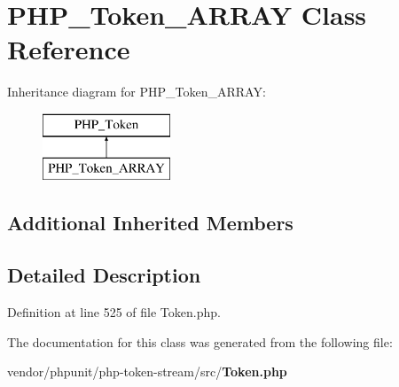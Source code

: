 \section{P\+H\+P\+\_\+\+Token\+\_\+\+A\+R\+R\+A\+Y Class Reference}
\label{class_p_h_p___token___a_r_r_a_y}
Inheritance diagram for P\+H\+P\+\_\+\+Token\+\_\+\+A\+R\+R\+A\+Y\+:\begin{figure}[H]
\begin{center}
\leavevmode
\includegraphics[height=2.000000cm]{class_p_h_p___token___a_r_r_a_y}
\end{center}
\end{figure}
\subsection*{Additional Inherited Members}


\subsection{Detailed Description}


Definition at line 525 of file Token.\+php.



The documentation for this class was generated from the following file\+:\begin{DoxyCompactItemize}
\item 
vendor/phpunit/php-\/token-\/stream/src/{\bf Token.\+php}\end{DoxyCompactItemize}
